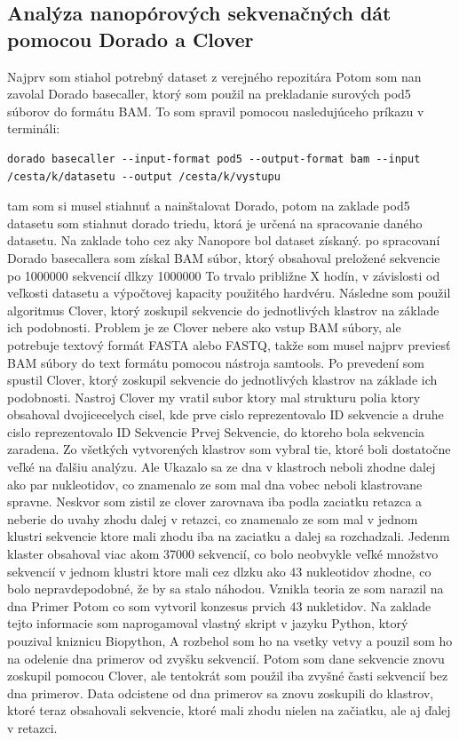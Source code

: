\subsection{Analýza nanopórových sekvenačných dát pomocou Dorado a Clover}
Najprv som stiahol potrebný dataset z verejného repozitára %
Potom som nan zavolal Dorado basecaller, ktorý som použil na prekladanie surových pod5 súborov do formátu BAM.
To som spravil pomocou nasledujúceho príkazu v termináli:
\begin{verbatim}        
dorado basecaller --input-format pod5 --output-format bam --input /cesta/k/datasetu --output /cesta/k/vystupu
\end{verbatim}
tam som si musel stiahnuť a nainštalovat Dorado, potom na zaklade pod5 datasetu som stiahnut dorado triedu, ktorá je určená na spracovanie daného datasetu. 
Na zaklade toho cez aky Nanopore bol dataset získaný.
po spracovaní Dorado basecallera som získal BAM súbor, ktorý obsahoval preložené sekvencie po 1000000 sekvencií dlkzy 1000000
To trvalo približne X hodín, v závislosti od veľkosti datasetu a výpočtovej kapacity použitého hardvéru. %
Následne som použil algoritmus Clover, ktorý zoskupil sekvencie do jednotlivých klastrov na základe ich podobnosti.
Problem je ze Clover nebere ako vstup BAM súbory, ale potrebuje textový formát FASTA alebo FASTQ, takže som musel najprv previesť BAM súbory do text formátu pomocou nástroja samtools. %
Po prevedení som spustil Clover, ktorý zoskupil sekvencie do jednotlivých klastrov na základe ich podobnosti.
Nastroj Clover my vratil subor ktory mal strukturu polia ktory obsahoval dvojicecelych cisel, kde prve cislo reprezentovalo ID sekvencie a druhe cislo reprezentovalo ID Sekvencie Prvej Sekvencie, do ktoreho bola sekvencia zaradena.
Zo všetkých vytvorených klastrov som vybral tie, ktoré boli dostatočne veľké na ďalšiu analýzu.
Ale Ukazalo sa ze dna v klastroch neboli zhodne dalej ako par nukleotidov, co znamenalo ze som mal dna vobec neboli klastrovane spravne.
Neskvor som zistil ze clover zarovnava iba podla zaciatku retazca a neberie do uvahy zhodu dalej v retazci, co znamenalo ze som mal v jednom klustri sekvencie ktore mali zhodu iba na zaciatku a dalej sa rozchadzali.
Jedenm klaster obsahoval viac akom 37000 sekvencií, co bolo neobvykle veľké množstvo sekvencií v jednom klustri ktore mali cez dlzku ako 43 nukleotidov zhodne, co bolo nepravdepodobné, že by sa stalo náhodou.
Vznikla teoria ze som narazil na dna Primer %
Potom co som vytvoril konzesus prvich 43 nukletidov.
Na zaklade tejto informacie som naprogamoval vlastný skript v jazyku Python, ktorý pouzival kniznicu Biopython, A rozbehol som ho na vsetky vetvy a pouzil som ho na odelenie dna primerov od zvyšku sekvencií.
Potom som dane sekvencie znovu zoskupil pomocou Clover, ale tentokrát som použil iba zvyšné časti sekvencií bez dna primerov.
Data odcistene od dna primerov sa znovu zoskupili do klastrov, ktoré teraz obsahovali sekvencie, ktoré mali zhodu nielen na začiatku, ale aj ďalej v retazci.

